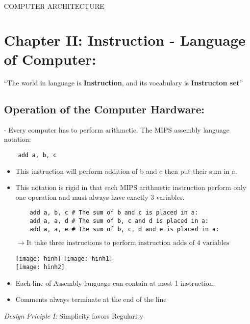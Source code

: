 \documentclass[10pt]{article}
\newcommand{\quotes}[1]{``#1''}
\begin{document}
	\begin{center}
		COMPUTER  ARCHITECTURE
	\end{center}

	\section{Chapter II: Instruction - Language of Computer:}
	\quotes{The world in language is \textbf{Instruction}, and its vocabulary is \textbf{Instructon set}} \\

	\subsection{Operation of the Computer Hardware: }
	- Every computer has to perform arithmetic. The MIPS assembly language notation: \\
	\begin{verbatim}
	add a, b, c
	\end{verbatim}

	\begin{itemize}
		\item This instruction will perform addition of b and c then put their sum in a.
		\item This notation is rigid in that each MIPS arithmetic instruction perform only one operation and must always have exactly 3 variables.

	\bigbreak
	\begin{verbatim}
	add a, b, c # The sum of b and c is placed in a:
	add a, a, d # The sum of b, c and d is placed in a:
	add a, a, e # The sum of b, c, d and e is placed in a:
	\end{verbatim}
	$\rightarrow{\mbox{ It take three instructions to perform instruction adds of 4 variables }}$

	\bigbreak
	\texttt{[image: hinh]}
	\bigbreak
	\texttt{[image: hinh1]} \\
	\texttt{[image: hinh2]}
	\bigbreak

		\item Each line of Assembly language can contain at most 1 instruction.
		\item Comments always terminate at the end of the line
	\end{itemize}

	\begin{mybox}
		\begin{center}
			\textit{Design Priciple I:} Simplicity favors Regularity
		\end{center}
	\end{mybox}
\end{document}

